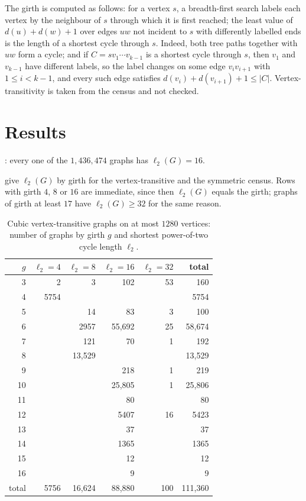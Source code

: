 \documentclass[11pt]{amsart}
\theoremstyle{remark}
\newcommand{\sv}{\ell_2}
\begin{document}
The girth is computed as follows: for a vertex $s$, a breadth-first search
labels each vertex by the neighbour of $s$ through which it is first reached;
the least value of $d(u)+d(w)+1$ over edges $uw$ not incident to $s$ with
differently labelled ends is the length of a shortest cycle through $s$. Indeed,
both tree paths together with $uw$ form a cycle; and if $C=sv_1\cdots v_{k-1}$
is a shortest cycle through $s$, then $v_1$ and $v_{k-1}$ have different labels,
so the label changes on some edge $v_iv_{i+1}$ with $1\le i<k-1$, and every such
edge satisfies $d(v_i)+d(v_{i+1})+1\le |C|$. Vertex-transitivity is taken
from the census and not checked.

\section{Results}\label{sec:results}

: every one of the $1{,}436{,}474$ graphs has $\sv(G)=16$.

 give $\sv(G)$ by girth for the vertex-transitive and the symmetric
census.
Rows with girth $4$, $8$ or $16$ are immediate, since then $\sv(G)$ equals the
girth; graphs of girth at least $17$ have $\sv(G)\ge 32$ for the same reason.

\begin{table}[ht]
\centering
\caption{Cubic vertex-transitive graphs on at most $1280$ vertices: number of
graphs by girth $g$ and shortest power-of-two cycle length $\sv$.}
\label{tab:vt}
\begin{tabular}{@{}rrrrrr@{}}
\toprule
$g$ & $\sv=4$ & $\sv=8$ & $\sv=16$ & $\sv=32$ & total\\
\midrule
3 & 2 & 3 & 102 & 53 & 160\\
4 & 5754 & & & & 5754\\
5 & & 14 & 83 & 3 & 100\\
6 & & 2957 & 55{,}692 & 25 & 58{,}674\\
7 & & 121 & 70 & 1 & 192\\
8 & & 13{,}529 & & & 13{,}529\\
9 & & & 218 & 1 & 219\\
10 & & & 25{,}805 & 1 & 25{,}806\\
11 & & & 80 & & 80\\
12 & & & 5407 & 16 & 5423\\
13 & & & 37 & & 37\\
14 & & & 1365 & & 1365\\
15 & & & 12 & & 12\\
16 & & & 9 & & 9\\
\addlinespace
total & 5756 & 16{,}624 & 88{,}880 & 100 & 111{,}360\\
\bottomrule
\end{tabular}
\end{table}
\end{document}
